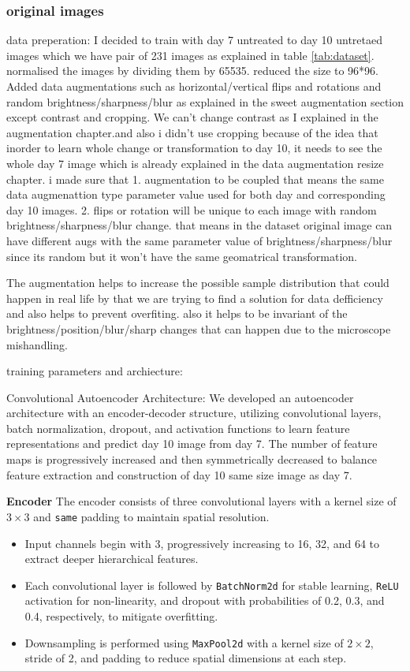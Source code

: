 \subsubsection*{original images}
data preperation: I decided to train with day 7 untreated to day 10 untretaed images which we have pair of 231 images as explained in table \ref{tab:dataset}.
 normalised the images by dividing them by 65535. reduced the size to 96*96. Added data augmentations such as horizontal/vertical flips and rotations and random brightness/sharpness/blur as explained in the sweet augmentation section  except contrast and cropping. We can't change contrast  as I explained in the augmentation chapter.and also i didn't use cropping because of the idea that inorder to learn whole change or transformation to day 10, it needs to see the whole day 7 image which is already explained in the data augmentation resize chapter. i made sure that 
 1. augmentation to be coupled that means the same  data augmenattion type parameter value used for both day and corresponding day 10 images. 
 2.  flips or rotation will be unique to each image with random brightness/sharpness/blur change. that means in the dataset original image can have different augs with the same parameter value of brightness/sharpness/blur since its random but it won't have the same geomatrical transformation.





The augmentation helps to increase the possible sample distribution that could happen in real life by that we are trying to find 
a solution for data defficiency and also helps to prevent overfiting.
also it helps to be invariant of the brightness/position/blur/sharp changes that can happen due to the microscope mishandling.


training parameters and archiecture:

Convolutional Autoencoder Architecture:
We developed an autoencoder architecture with an encoder-decoder structure, utilizing convolutional layers, batch normalization, dropout, and activation functions
 to learn feature representations and predict day 10 image from day 7. The number of feature maps is progressively increased and then symmetrically decreased to balance
  feature extraction and construction of day 10 same size image as day 7.   


  \textbf{Encoder}
  The encoder consists of three convolutional layers with a kernel size of $3 \times 3$ and \texttt{same} padding to maintain spatial resolution.  
  \begin{itemize}
      \item Input channels begin with 3, progressively increasing to 16, 32, and 64 to extract deeper hierarchical features.  
      \item Each convolutional layer is followed by \texttt{BatchNorm2d} for stable learning, \texttt{ReLU} activation for non-linearity, and dropout with probabilities of 0.2, 0.3, and 0.4, respectively, to mitigate overfitting.  
      \item Downsampling is performed using \texttt{MaxPool2d} with a kernel size of $2 \times 2$, stride of 2, and padding to reduce spatial dimensions at each step.  
  \end{itemize}
  
